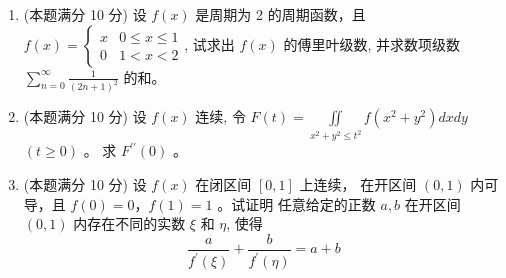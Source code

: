 \begin{enumerate}


\item 
(本题满分 10 分)
设 $f(x)$ 是周期为 2 的周期函数，且 $f(x)=\left\{\begin{array}{ll}x & 0 \leqslant x \leqslant 1 \\ 0 & 1<x<2\end{array}\right.$, 试求出 $f(x)$ 的傅里叶级数,
并求数项级数 $\sum\limits_{n=0}^{\infty} \frac{1}{(2 n+1)^{2}}$ 的和。




\item 
(本题满分 10 分)
设 $f(x)$ 连续, 令 $F(t)=\iint\limits_{x^{2}+y^{2} \leqslant t^{2}} f\left(x^{2}+y^{2}\right) d x d y$ $(t \geqslant 0)$ 。 求 $F^{\prime \prime}(0)$ 。



\item 
(本题满分 10 分)
设 $f(x)$ 在闭区间 $[0,1]$ 上连续， 在开区间 $(0,1)$ 内可导，且 $f(0)=0$，$ f(1)=1$ 。试证明 任意给定的正数 $a, b$ 在开区间 $(0,1)$ 内存在不同的实数 $\xi$ 和 $\eta$, 使得 
\[ 
\frac{a}{f^{\prime}(\xi)}+\frac{b}{f^{\prime}(\eta)}=a+b
 \]

	






	
\end{enumerate}



